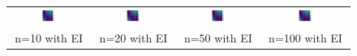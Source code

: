 \documentclass[11pt]{article}
\begin{document}
\begin{figure}[H]
    \centering
    \begin{tabular}{cccc}
        \includegraphics[width=0.225\textwidth]{../Task-02/plots/true_function_rational_quadratic_n10_EI.png} &
        \includegraphics[width=0.225\textwidth]{../Task-02/plots/true_function_rational_quadratic_n20_EI.png} &
        \includegraphics[width=0.225\textwidth]{../Task-02/plots/true_function_rational_quadratic_n50_EI.png} &
        \includegraphics[width=0.225\textwidth]{../Task-02/plots/true_function_rational_quadratic_n100_EI.png} \\
        n=10 with EI & n=20 with EI & n=50 with EI & n=100 with EI \\[0.5em]
        

\end{tabular}
\end{figure}
\end{document}
